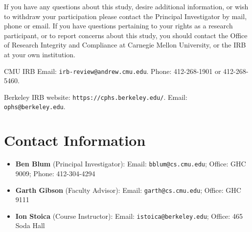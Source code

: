 \documentclass{article}
\begin{document}
\noindent If you have any questions about this study, desire additional information, or wish to withdraw
your participation please contact the Principal Investigator by mail, phone or email.
If you have questions pertaining to your rights as a research participant,
or to report concerns about this study, you should contact the
Office of Research Integrity and Compliance at Carnegie Mellon University,
or the IRB at your own institution.

CMU IRB Email: {\tt irb-review@andrew.cmu.edu}. Phone: 412-268-1901 or 412-268-5460.

Berkeley IRB website: {\tt https://cphs.berkeley.edu/}. Email: {\tt ophs@berkeley.edu}.

\section{Contact Information}

\begin{itemize}
	\item {\bf Ben Blum} (Principal Investigator): Email: {\tt bblum@cs.cmu.edu}; Office: GHC 9009; Phone: 412-304-4294
	\item {\bf Garth Gibson} (Faculty Advisor): Email: {\tt garth@cs.cmu.edu}; Office: GHC 9111
	\item {\bf Ion Stoica} (Course Instructor): Email: {\tt istoica@berkeley.edu}; Office: 465 Soda Hall
\end{itemize}
\end{document}
